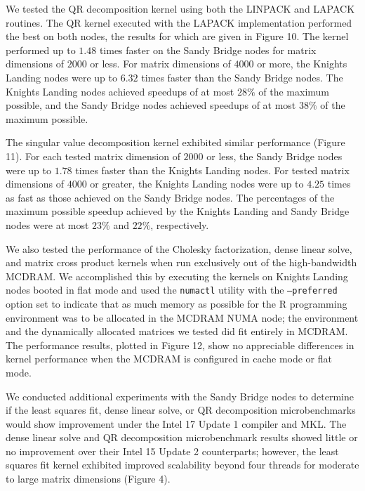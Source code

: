 We tested the QR decomposition kernel using both the LINPACK and LAPACK
  routines.
The QR kernel executed with the LAPACK implementation performed the best on both
  nodes, the results for which are given in Figure 10.
The kernel performed up to $1.48$ times faster on the Sandy Bridge nodes for
  matrix dimensions of $2000$ or less.
For matrix dimensions of $4000$ or more, the Knights Landing nodes were up to
  $6.32$ times faster than the Sandy Bridge nodes.
The Knights Landing nodes achieved speedups of at most $28\%$ of the maximum
  possible, and the Sandy Bridge nodes achieved speedups of at most $38\%$ of
  the maximum possible.

The singular value decomposition kernel exhibited similar performance
  (Figure 11).
For each tested matrix dimension of $2000$ or less, the Sandy Bridge nodes were
  up to $1.78$ times faster than the Knights Landing nodes.
For tested matrix dimensions of $4000$ or greater, the Knights Landing nodes
  were up to $4.25$ times as fast as those achieved on the Sandy Bridge nodes.
The percentages of the maximum possible speedup achieved by the Knights Landing
  and Sandy Bridge nodes were at most $23\%$ and $22\%$, respectively.

We also tested the performance of the Cholesky factorization, dense linear
  solve, and matrix cross product kernels when run exclusively out of the
  high-bandwidth MCDRAM.
We accomplished this by executing the kernels on Knights Landing nodes booted in
  flat mode and used the \texttt{numactl} utility with the \texttt{--preferred} option
  set to indicate that as much memory as possible for the R programming
  environment was to be allocated in the MCDRAM NUMA node; the environment and
  the dynamically allocated matrices we tested did fit entirely in MCDRAM.
The performance results, plotted in Figure 12, show no appreciable differences
  in kernel performance when the MCDRAM is configured in cache mode or flat
  mode.

We conducted additional experiments with the Sandy Bridge nodes to determine if
  the least squares fit, dense linear solve, or QR decomposition microbenchmarks
  would show improvement under the Intel 17 Update 1 compiler and MKL.
The dense linear solve and QR decomposition microbenchmark results showed little
  or no improvement over their Intel 15 Update 2 counterparts; however, the
  least squares fit kernel exhibited improved scalability beyond four threads
  for moderate to large matrix dimensions (Figure 4).

